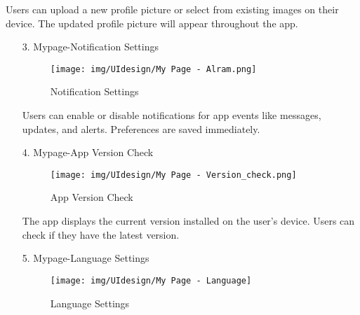 \documentclass[conference]{IEEEtran}
\begin{document}
\begin{enumerate}
\begin{itemize}
\begin{itemize}
\begin{enumerate}
\begin{enumerate}
    Users can upload a new profile picture or select from existing images on their device. The updated profile picture will appear throughout the app. \\
\end{enumerate}

\begin{enumerate}
    \item[3.] Mypage-Notification Settings
    \begin{figure}[h]
        {\centering
        \hspace{4cm}
        \begin{minipage}{0.4\columnwidth}
            \texttt{[image: img/UIdesign/My Page - Alram.png]}
            \caption{Notification Settings}
        \end{minipage}}
    \end{figure}

    Users can enable or disable notifications for app events like messages, updates, and alerts. Preferences are saved immediately. \\ 
\end{enumerate}

\begin{enumerate}
    \item[4.] Mypage-App Version Check
    \begin{figure}[h]
        {\centering
        \hspace{4cm}
        \begin{minipage}{0.4\columnwidth}
            \texttt{[image: img/UIdesign/My Page - Version\_check.png]}
            \caption{App Version Check}
        \end{minipage}}
    \end{figure}

    The app displays the current version installed on the user's device. Users can check if they have the latest version. \\
\end{enumerate}

\begin{enumerate}
    \item[5.] Mypage-Language Settings
    \begin{figure}[h]
        {\centering
        \hspace{4cm}
        \begin{minipage}{0.4\columnwidth}
            \texttt{[image: img/UIdesign/My Page - Language]}
            \caption{Language Settings}
        \end{minipage}}
    \end{figure}


\end{enumerate}
\end{enumerate}
\end{itemize}
\end{itemize}
\end{enumerate}
\end{document}

